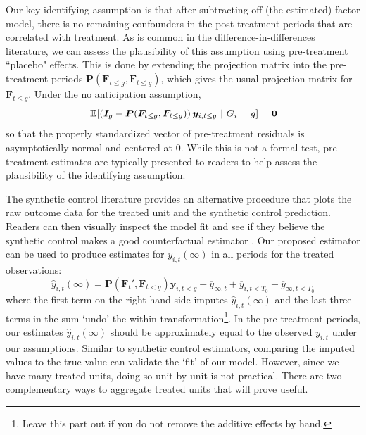 \documentclass[12pt]{article}
\begin{document}
\begin{remark}\label{remark:assessing_assumptions}

Our key identifying assumption is that after subtracting off (the estimated) factor model, there is no remaining confounders in the post-treatment periods that are correlated with treatment. As is common in the difference-in-differences literature, we can assess the plausibility of this assumption using pre-treatment ``placebo" effects. This is done by extending the projection matrix into the pre-treatment periods $\bm P(\bm{F}_{t \leq g}, \bm{F}_{t \leq g})$, which gives the usual projection matrix for $\bm F_{t \leq g}$. Under the no anticipation assumption, 
\begin{equation}
  \expec{ \left( \bm I_{g} - \bm P(\bm{F}_{t \leq g}, \bm{F}_{t \leq g}) \right) \bm y_{i, t \leq g}}{G_i = g} = \bm 0
\end{equation}
so that the properly standardized vector of pre-treatment residuals is asymptotically normal and centered at 0. While this is not a formal test, pre-treatment estimates are typically presented to readers to help assess the plausibility of the identifying assumption.

The synthetic control literature provides an alternative procedure that plots the raw outcome data for the treated unit and the synthetic control prediction. Readers can then visually inspect the model fit and see if they believe the synthetic control makes a good counterfactual estimator \citep{abadie2021using}. Our proposed estimator can be used to produce estimates for $y_{i,t}(\infty)$ in all periods for the treated observations:
\begin{equation}
  \hat{y}_{i,t}(\infty) = \bm P(\bm{F}_t', \bm{F}_{t < g}) \bm y_{i, t<g} + \overline{y}_{\infty, t} + \overline{y}_{i, t<T_0} - \overline{y}_{\infty, t<T_0}
\end{equation}
where the first term on the right-hand side imputes $\hat{y}_{i,t}(\infty)$ and the last three terms in the sum `undo' the within-transformation\footnote{Leave this part out if you do not remove the additive effects by hand.}. In the pre-treatment periods, our estimates $\hat{y}_{i,t}(\infty)$ should be approximately equal to the observed $y_{i,t}$ under our assumptions. Similar to synthetic control estimators, comparing the imputed values to the true value can validate the `fit' of our model. However, since we have many treated units, doing so unit by unit is not practical. There are two complementary ways to aggregate treated units that will prove useful. 


\end{remark}
\end{document}
